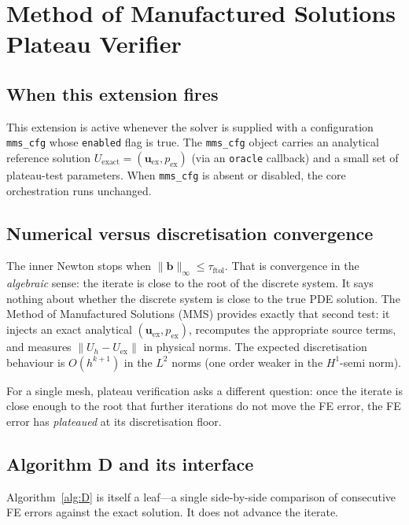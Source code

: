 \documentclass{article}
\newcommand{\code}[1]{\texttt{\small #1}}
\newcommand{\textftol}{\tau_{\mathrm{ftol}}}
\newcommand{\extline}[1]{{\color{extcolor}#1}}
\begin{document}
\section{Method of Manufactured Solutions Plateau Verifier}
\label{sec:mms}

\subsection{When this extension fires}

This extension is active whenever the solver is supplied with a
configuration \code{mms\_cfg} whose \code{enabled} flag is true. The
\code{mms\_cfg} object carries an analytical reference solution
$U_{\mathrm{exact}} = (\boldsymbol{u}_{\mathrm{ex}}, p_{\mathrm{ex}})$
(via an \code{oracle} callback) and a small set of plateau-test
parameters. When \code{mms\_cfg} is absent or disabled, the core
orchestration runs unchanged.

\subsection{Numerical versus discretisation convergence}

The inner Newton stops when $\|\boldsymbol{b}\|_\infty \le \textftol$.
That is convergence in the \emph{algebraic} sense: the iterate is
close to the root of the discrete system. It says nothing about
whether the discrete system is close to the true PDE solution. The
Method of Manufactured Solutions (MMS) provides exactly that second
test: it injects an exact analytical
$(\boldsymbol{u}_{\mathrm{ex}}, p_{\mathrm{ex}})$, recomputes the
appropriate source terms, and measures $\|U_h - U_{\mathrm{ex}}\|$ in
physical norms. The expected discretisation behaviour is $O(h^{k+1})$
in the $L^2$ norms (one order weaker in the $H^1$-semi norm).

For a single mesh, plateau verification asks a different question:
once the iterate is close enough to the root that further iterations
do not move the FE error, the FE error has \emph{plateaued} at its
discretisation floor.

\subsection{Algorithm D and its interface}

\extline{Algorithm~\ref{alg:D} is itself a leaf---a single side-by-side
comparison of consecutive FE errors against the exact solution. It
does not advance the iterate.}
\end{document}
